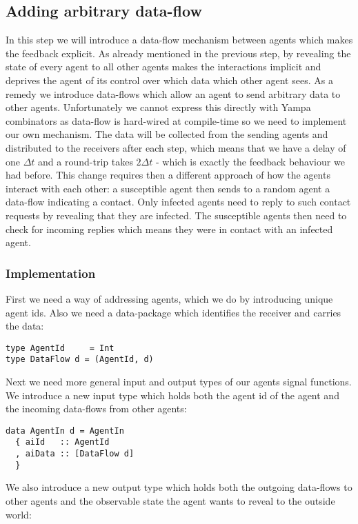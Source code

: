 \subsection{Adding arbitrary data-flow}
\label{sec:step3_dataflow}
In this step we will introduce a data-flow mechanism between agents which makes the feedback explicit. As already mentioned in the previous step, by revealing the state of every agent to all other agents makes the interactions implicit and deprives the agent of its control over which data which other agent sees. As a remedy we introduce data-flows which allow an agent to send arbitrary data to other agents. Unfortunately we cannot express this directly with Yampa combinators as data-flow is hard-wired at compile-time so we need to implement our own mechanism. The data will be collected from the sending agents and distributed to the receivers after each step, which means that we have a delay of one $\Delta t$ and a round-trip takes $2 \Delta t$ - which is exactly the feedback behaviour we had before.
This change requires then a different approach of how the agents interact with each other: a susceptible agent then sends to a random agent a data-flow indicating a contact. Only infected agents need to reply to such contact requests by revealing that they are infected. The susceptible agents then need to check for incoming replies which means they were in contact with an infected agent.

\subsubsection{Implementation}
First we need a way of addressing agents, which we do by introducing unique agent ids. Also we need a data-package which identifies the receiver and carries the data:
\begin{verbatim}
type AgentId     = Int
type DataFlow d = (AgentId, d)
\end{verbatim}

Next we need more general input and output types of our agents signal functions. We introduce a new input type which holds both the agent id of the agent and the incoming data-flows from other agents:

\begin{verbatim}
data AgentIn d = AgentIn
  { aiId   :: AgentId
  , aiData :: [DataFlow d]
  } 
\end{verbatim}

We also introduce a new output type which holds both the outgoing data-flows to other agents and the observable state the agent wants to reveal to the outside world:

